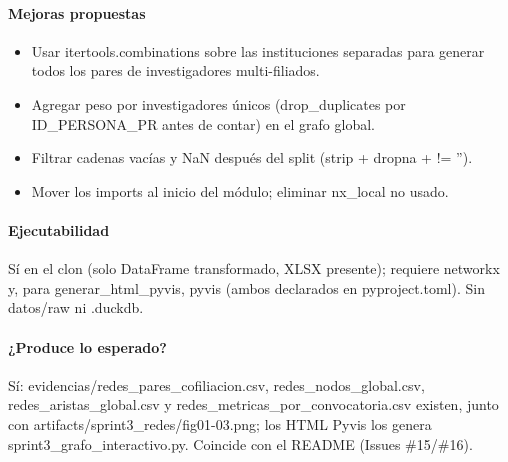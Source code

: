 \paragraph{Mejoras propuestas}
\begin{itemize}
  \item Usar itertools.combinations sobre las instituciones separadas para generar todos los pares de investigadores multi-filiados.
  \item Agregar peso por investigadores únicos (drop\_duplicates por ID\_PERSONA\_PR antes de contar) en el grafo global.
  \item Filtrar cadenas vacías y NaN después del split (strip + dropna + != '').
  \item Mover los imports al inicio del módulo; eliminar nx\_local no usado.
\end{itemize}

\paragraph{Ejecutabilidad}
Sí en el clon (solo DataFrame transformado, XLSX presente); requiere networkx y, para generar\_html\_pyvis, pyvis (ambos declarados en pyproject.toml). Sin datos/raw ni .duckdb.

\paragraph{¿Produce lo esperado?}
Sí: evidencias/redes\_pares\_cofiliacion.csv, redes\_nodos\_global.csv, redes\_aristas\_global.csv y redes\_metricas\_por\_convocatoria.csv existen, junto con artifacts/sprint3\_redes/fig01-03.png; los HTML Pyvis los genera sprint3\_grafo\_interactivo.py. Coincide con el README (Issues \#15/\#16).

